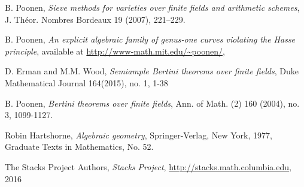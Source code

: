 \documentclass[12pt]{article}
\theoremstyle{plain}
\theoremstyle{definition}
\newcommand{\<}{\langle}
\renewcommand{\>}{\rangle}
\begin{document}
\begin{thebibliography}{9}
B. Poonen, \textit{Sieve methods for varieties over finite fields and arithmetic schemes}, J. Théor. Nombres Bordeaux 19 (2007), 221–229.

B. Poonen, \textit{An explicit algebraic family of genus-one curves violating the Hasse principle}, available at \url{http://www-math.mit.edu/~poonen/}, 

D. Erman and M.M. Wood, \textit{Semiample Bertini theorems over finite fields}, Duke Mathematical Journal 164(2015), no. 1, 1-38

B. Poonen, \textit{Bertini theorems over finite fields}, Ann. of Math. (2) 160 (2004), no. 3, 1099-1127.

Robin Hartshorne, \textit{Algebraic geometry}, Springer-Verlag, New York, 1977, Graduate Texts in
Mathematics, No. 52.

The Stacks Project Authors, \textit{Stacks Project}, \url{http://stacks.math.columbia.edu}, 2016


\end{thebibliography}
\end{document}
